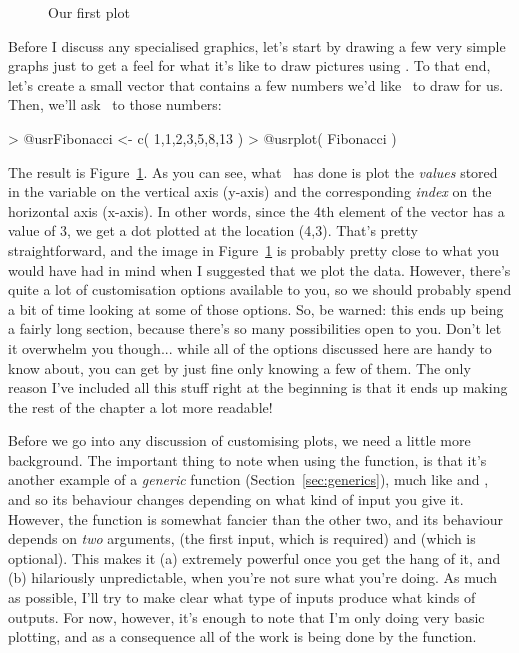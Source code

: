 \begin{figure}[t]
\begin{center}
\caption{Our first plot}
\HR
\label{fig:firstplot}
\end{center}
\end{figure}


Before I discuss any specialised graphics, let's start by drawing a few very simple graphs just to get a feel for what it's like to draw pictures using \R. To that end, let's create a small vector  that contains a few numbers we'd like \R\ to draw for us. Then, we'll ask \R\ to  those numbers:
\begin{rblock1}
> @usr{Fibonacci <- c( 1,1,2,3,5,8,13 )}
> @usr{plot( Fibonacci )}
\end{rblock1}
The result is Figure~\ref{fig:firstplot}. As you can see, what \R\ has done is plot the {\it values} stored in the  variable on the vertical axis (y-axis) and the corresponding {\it index} on the horizontal axis (x-axis). In other words, since the 4th element of the vector has a value of 3, we get a dot plotted at the location (4,3). That's pretty straightforward, and the image in Figure~\ref{fig:firstplot} is probably pretty close to what you would have had in mind when I suggested that we plot the  data. However, there's quite a lot of customisation options available to you, so we should probably spend a bit of time looking at some of those options. So, be warned: this ends up being a fairly long section, because there's so many possibilities open to you. Don't let it overwhelm you though... while all of the options discussed here are handy to know about, you can get by just fine only knowing a few of them. The only reason I've included all this stuff right at the beginning is that it ends up making the rest of the chapter a lot more readable!




Before we go into any discussion of customising plots, we need a little more background. The important thing to note when using the  function, is that it's another example of a {\it generic} function (Section~\ref{sec:generics}), much like  and , and so its behaviour changes depending on what kind of input you give it. However, the  function is somewhat fancier than the other two, and its behaviour depends on {\it two} arguments,  (the first input, which is required) and  (which is optional). This makes it (a) extremely powerful once you get the hang of it, and (b) hilariously unpredictable, when you're not sure what you're doing. As much as possible, I'll try to make clear what type of inputs produce what kinds of outputs. For now, however, it's enough to note that I'm only doing very basic plotting, and as a consequence all of the work is being done by the  function.

